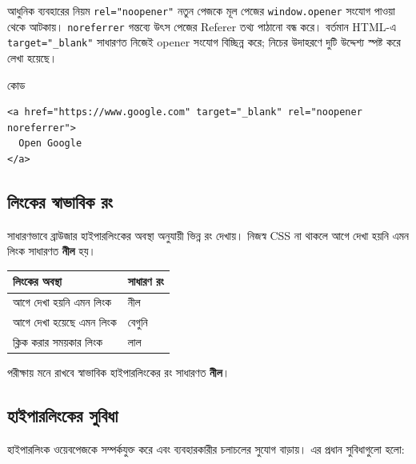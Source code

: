 \begin{keypointbox}{আধুনিক ব্যবহারের নিয়ম}
\texttt{rel="noopener"} নতুন পেজকে মূল পেজের \texttt{window.opener} সংযোগ পাওয়া থেকে আটকায়। \texttt{noreferrer} গন্তব্যে উৎস পেজের Referer তথ্য পাঠানো বন্ধ করে। বর্তমান HTML-এ \texttt{target="\_blank"} সাধারণত নিজেই opener সংযোগ বিচ্ছিন্ন করে; নিচের উদাহরণে দুটি উদ্দেশ্য স্পষ্ট করে লেখা হয়েছে।
\end{keypointbox}

\begin{examplebox}{কোড}
\par\noindent\begin{minipage}{\linewidth}
\begin{verbatim}
<a href="https://www.google.com" target="_blank" rel="noopener noreferrer">
  Open Google
</a>
\end{verbatim}
\end{minipage}\par
\end{examplebox}

\subsection{লিংকের স্বাভাবিক রং}

সাধারণভাবে ব্রাউজার হাইপারলিংকের অবস্থা অনুযায়ী ভিন্ন রং দেখায়। নিজস্ব CSS না থাকলে আগে দেখা হয়নি এমন লিংক সাধারণত \textbf{নীল} হয়।

\begin{center}
\begin{tabular}{|p{}|p{}|}
\hline
\textbf{লিংকের অবস্থা} & \textbf{সাধারণ রং} \\
\hline
আগে দেখা হয়নি এমন লিংক & নীল \\
\hline
আগে দেখা হয়েছে এমন লিংক & বেগুনি \\
\hline
ক্লিক করার সময়কার লিংক & লাল \\
\hline
\end{tabular}
\end{center}

\begin{boardbox}{পরীক্ষায় মনে রাখবে}
স্বাভাবিক হাইপারলিংকের রং সাধারণত \textbf{নীল}।
\end{boardbox}

\subsection{হাইপারলিংকের সুবিধা}

হাইপারলিংক ওয়েবপেজকে সম্পর্কযুক্ত করে এবং ব্যবহারকারীর চলাচলের সুযোগ বাড়ায়। এর প্রধান সুবিধাগুলো হলো:

